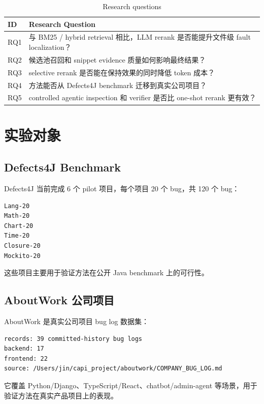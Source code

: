 \documentclass[12pt,a4paper]{ctexart}
\begin{document}
\begin{table}[H]
\centering
\caption{Research questions}
\label{tab:rq}
\begin{tabularx}{\textwidth}{@{}lY@{}}
\toprule
ID & Research Question \\
\midrule
RQ1 & 与 BM25 / hybrid retrieval 相比，LLM rerank 是否能提升文件级 fault localization？ \\
RQ2 & 候选池召回和 snippet evidence 质量如何影响最终结果？ \\
RQ3 & selective rerank 是否能在保持效果的同时降低 token 成本？ \\
RQ4 & 方法能否从 Defects4J benchmark 迁移到真实公司项目？ \\
RQ5 & controlled agentic inspection 和 verifier 是否比 one-shot rerank 更有效？ \\
\bottomrule
\end{tabularx}
\end{table}

\section{实验对象}

\subsection{Defects4J Benchmark}

Defects4J 当前完成 6 个 pilot 项目，每个项目 20 个 bug，共 120 个 bug：

\begin{lstlisting}
Lang-20
Math-20
Chart-20
Time-20
Closure-20
Mockito-20
\end{lstlisting}

这些项目主要用于验证方法在公开 Java benchmark 上的可行性。

\subsection{AboutWork 公司项目}

AboutWork 是真实公司项目 bug log 数据集：

\begin{lstlisting}
records: 39 committed-history bug logs
backend: 17
frontend: 22
source: /Users/jin/capi_project/aboutwork/COMPANY_BUG_LOG.md
\end{lstlisting}

它覆盖 Python/Django、TypeScript/React、chatbot/admin-agent 等场景，用于验证方法在真实产品项目上的表现。
\end{document}
